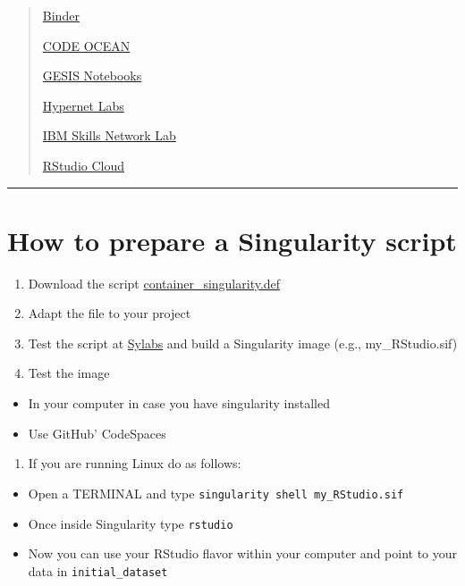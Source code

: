 \documentclass[
  12pt,
]{article}
\providecommand{\tightlist}{%
  \setlength{\itemsep}{0pt}\setlength{\parskip}{0pt}}
\begin{document}
\begin{quote}
\href{https://mybinder.org/}{Binder}

\href{https://codeocean.com/}{CODE OCEAN}

\href{https://notebooks.gesis.org/hub/home}{GESIS Notebooks}

\href{https://codeocean.com/}{Hypernet Labs}

\href{https://labs.cognitiveclass.ai/}{IBM Skills Network Lab}

\href{https://rstudio.cloud/}{RStudio Cloud}
\end{quote}

\begin{center}\rule{0.5\linewidth}{0.5pt}\end{center}

\hypertarget{how-to-prepare-a-singularity-script}{%
\section{How to prepare a Singularity
script}\label{how-to-prepare-a-singularity-script}}

\begin{enumerate}
\def\labelenumi{\arabic{enumi}.}
\item
  Download the script
  \href{https://github.com/reisportela/R_Training/tree/master/_containers/container_singularity.def}{container\_singularity.def}
\item
  Adapt the file to your project
\item
  Test the script at \href{https://cloud.sylabs.io/}{Sylabs} and build a
  Singularity image (e.g., my\_RStudio.sif)
\item
  Test the image
\end{enumerate}

\begin{itemize}
\item
  In your computer in case you have singularity installed
\item
  Use GitHub' CodeSpaces
\end{itemize}

\begin{enumerate}
\def\labelenumi{\arabic{enumi}.}
\setcounter{enumi}{5}
\tightlist
\item
  If you are running Linux do as follows:
\end{enumerate}

\begin{itemize}
\item
  Open a TERMINAL and type \texttt{singularity\ shell\ my\_RStudio.sif}
\item
  Once inside Singularity type \texttt{rstudio}
\item
  Now you can use your RStudio flavor within your computer and point to
  your data in \texttt{initial\_dataset}
\end{itemize}
\end{document}
